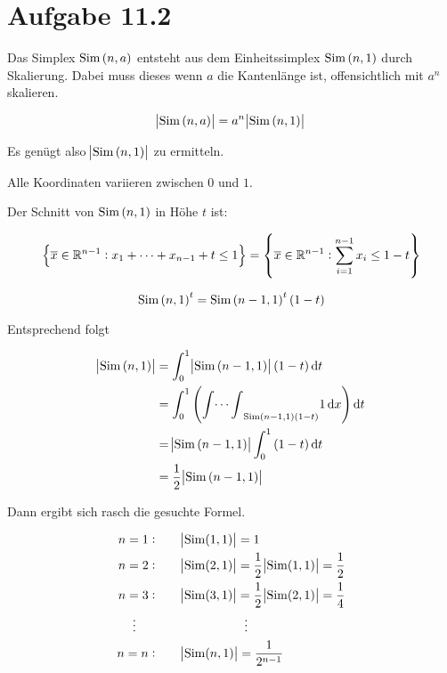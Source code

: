 \documentclass[a4paper,german,12pt,smallheadings]{scrartcl}
\begin{document}
\section*{Aufgabe 11.2}

Das Simplex $\operatorname{Sim}\del{n, a}$ entsteht aus dem Einheitssimplex
$\operatorname{Sim}\del{n,1}$ durch Skalierung. Dabei muss dieses wenn $a$ die
Kantenlänge ist, offensichtlich mit $a^n$ skalieren.

\begin{equation*}
  \envert{\operatorname{Sim}\del{n, a}} = a^n \envert{\operatorname{Sim}\del{n, 1}}
\end{equation*}

Es genügt also $\envert{\operatorname{Sim}\del{n, 1}}$ zu ermitteln.

Alle Koordinaten variieren zwischen $0$ und $1$.

Der Schnitt von $\operatorname{Sim}\del{n,1}$ in Höhe $t$ ist:

\begin{equation*}
  \cbr{\overline{x} \in \mathbb{R}^{n-1}: x_1 + \dots + x_{n-1} + t \le 1} =
  \cbr{\overline{x} \in \mathbb{R}^{n-1}: \sum_{i=1}^{n-1} x_i\le 1 - t}
\end{equation*}

\begin{equation*}
  \operatorname{Sim}\del{n,1}^t = \operatorname{Sim}\del{n-1, 1}^t (1-t)
\end{equation*}

Entsprechend folgt

\begin{align*}
  \envert{\operatorname{Sim}\del{n,1}} &= \int_0^1 \envert{\operatorname{Sim}\del{n-1,1}} (1-t) \dif t \\
                                       &= \int_0^1 \del{{\int \dots \int}_{\operatorname{Sim}\del{n-1,1} (1-t)} 1 \dif x} \dif t \\
    &= \envert{\operatorname{Sim}\del{n-1, 1}} \int_0^1 \del{1-t} \dif t \\
    &= \frac{1}{2} \envert{\operatorname{Sim}\del{n-1, 1}}
\end{align*}

Dann ergibt sich rasch die gesuchte Formel.

\begin{align*}
  n = 1: \qquad &\envert{\operatorname{Sim}(1,1)} = 1 \\
  n = 2: \qquad &\envert{\operatorname{Sim}(2,1)} = \frac{1}{2} \envert{\operatorname{Sim}(1,1)} = \frac{1}{2} \\
  n = 3: \qquad &\envert{\operatorname{Sim}(3,1)} = \frac{1}{2} \envert{\operatorname{Sim}(2,1)} = \frac{1}{4} \\
  \vdots \qquad \quad \;\;  & \qquad \qquad \quad \, \vdots \\
  n = n: \qquad &\envert{\operatorname{Sim}(n,1)} = \frac{1}{2^{n-1}}
\end{align*}
\end{document}
